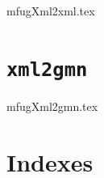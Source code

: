 \documentclass[11pt,a4paper]{report}
\begin{document}
{mfugXml2xml.tex}


\part{{\tt xml2gmn}}

{mfugXml2gmn.tex}



\part{Indexes}

\useListsPagesHeadersAndFooters

\printindex[Files]

\printindex[Options]

\printindex[MusicXML]

\printindex[Main]


\end{document}
